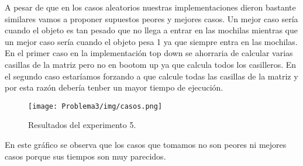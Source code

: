 
A pesar de que en los casos aleatorios nuestras implementaciones dieron bastante similares vamos a proponer supuestos peores y mejores casos. Un mejor caso ser\'ia cuando el objeto es tan pesado que no llega a entrar en las mochilas mientras que un mejor caso ser\'ia cuando el objeto pesa 1 ya que siempre entra en las mochilas. En el primer caso en la implementaci\'on top down se ahorraria de calcular varias casillas de la matriz pero no en bootom up ya que calcula todos los casilleros. En el segundo caso estar\'iamos forzando a que calcule todas las casillas de la matriz y por esta raz\'on deber\'ia tenber un mayor tiempo de ejecuci\'on.

\begin{figure}[H]
	\centering
	\texttt{[image: Problema3/img/casos.png]}
	\caption{Resultados del experimento 5.}
	\label{fig: exp5_casos}
\end{figure}

En este gr\'afico se observa que los casos que tomamos no son peores ni mejores casos porque sus tiempos son muy parecidos.
